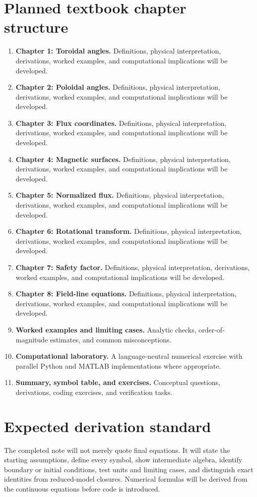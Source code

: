 \documentclass[11pt]{article}
\begin{document}
\section{Planned textbook chapter structure}
\begin{enumerate}[leftmargin=1.8em]
\item \textbf{Chapter 1: Toroidal angles.} Definitions, physical interpretation, derivations, worked examples, and computational implications will be developed.
\item \textbf{Chapter 2: Poloidal angles.} Definitions, physical interpretation, derivations, worked examples, and computational implications will be developed.
\item \textbf{Chapter 3: Flux coordinates.} Definitions, physical interpretation, derivations, worked examples, and computational implications will be developed.
\item \textbf{Chapter 4: Magnetic surfaces.} Definitions, physical interpretation, derivations, worked examples, and computational implications will be developed.
\item \textbf{Chapter 5: Normalized flux.} Definitions, physical interpretation, derivations, worked examples, and computational implications will be developed.
\item \textbf{Chapter 6: Rotational transform.} Definitions, physical interpretation, derivations, worked examples, and computational implications will be developed.
\item \textbf{Chapter 7: Safety factor.} Definitions, physical interpretation, derivations, worked examples, and computational implications will be developed.
\item \textbf{Chapter 8: Field-line equations.} Definitions, physical interpretation, derivations, worked examples, and computational implications will be developed.
\item \textbf{Worked examples and limiting cases.} Analytic checks, order-of-magnitude estimates, and common misconceptions.
\item \textbf{Computational laboratory.} A language-neutral numerical exercise with parallel Python and MATLAB implementations where appropriate.
\item \textbf{Summary, symbol table, and exercises.} Conceptual questions, derivations, coding exercises, and verification tasks.
\end{enumerate}

\section{Expected derivation standard}
The completed note will not merely quote final equations. It will state the starting assumptions, define every symbol, show intermediate algebra, identify boundary or initial conditions, test units and limiting cases, and distinguish exact identities from reduced-model closures. Numerical formulas will be derived from the continuous equations before code is introduced.
\end{document}
